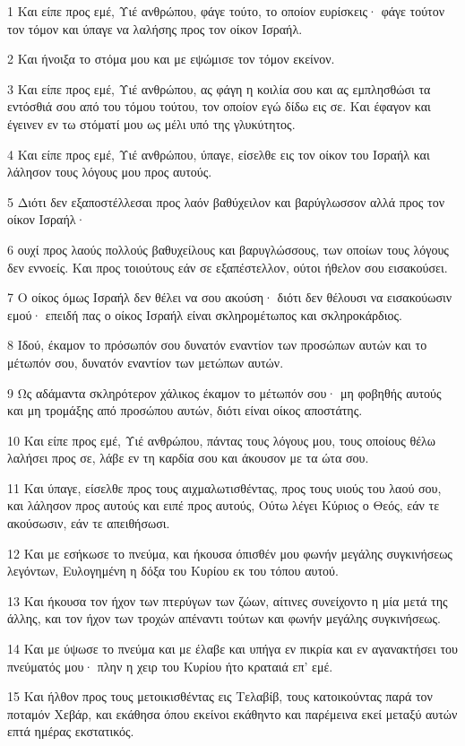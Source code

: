 \par 1 Και είπε προς εμέ, Υιέ ανθρώπου, φάγε τούτο, το οποίον ευρίσκεις· φάγε τούτον τον τόμον και ύπαγε να λαλήσης προς τον οίκον Ισραήλ.
\par 2 Και ήνοιξα το στόμα μου και με εψώμισε τον τόμον εκείνον.
\par 3 Και είπε προς εμέ, Υιέ ανθρώπου, ας φάγη η κοιλία σου και ας εμπλησθώσι τα εντόσθιά σου από του τόμου τούτου, τον οποίον εγώ δίδω εις σε. Και έφαγον και έγεινεν εν τω στόματί μου ως μέλι υπό της γλυκύτητος.
\par 4 Και είπε προς εμέ, Υιέ ανθρώπου, ύπαγε, είσελθε εις τον οίκον του Ισραήλ και λάλησον τους λόγους μου προς αυτούς.
\par 5 Διότι δεν εξαποστέλλεσαι προς λαόν βαθύχειλον και βαρύγλωσσον αλλά προς τον οίκον Ισραήλ·
\par 6 ουχί προς λαούς πολλούς βαθυχείλους και βαρυγλώσσους, των οποίων τους λόγους δεν εννοείς. Και προς τοιούτους εάν σε εξαπέστελλον, ούτοι ήθελον σου εισακούσει.
\par 7 Ο οίκος όμως Ισραήλ δεν θέλει να σου ακούση· διότι δεν θέλουσι να εισακούωσιν εμού· επειδή πας ο οίκος Ισραήλ είναι σκληρομέτωπος και σκληροκάρδιος.
\par 8 Ιδού, έκαμον το πρόσωπόν σου δυνατόν εναντίον των προσώπων αυτών και το μέτωπόν σου, δυνατόν εναντίον των μετώπων αυτών.
\par 9 Ως αδάμαντα σκληρότερον χάλικος έκαμον το μέτωπόν σου· μη φοβηθής αυτούς και μη τρομάξης από προσώπου αυτών, διότι είναι οίκος αποστάτης.
\par 10 Και είπε προς εμέ, Υιέ ανθρώπου, πάντας τους λόγους μου, τους οποίους θέλω λαλήσει προς σε, λάβε εν τη καρδία σου και άκουσον με τα ώτα σου.
\par 11 Και ύπαγε, είσελθε προς τους αιχμαλωτισθέντας, προς τους υιούς του λαού σου, και λάλησον προς αυτούς και ειπέ προς αυτούς, Ούτω λέγει Κύριος ο Θεός, εάν τε ακούσωσιν, εάν τε απειθήσωσι.
\par 12 Και με εσήκωσε το πνεύμα, και ήκουσα όπισθέν μου φωνήν μεγάλης συγκινήσεως λεγόντων, Ευλογημένη η δόξα του Κυρίου εκ του τόπου αυτού.
\par 13 Και ήκουσα τον ήχον των πτερύγων των ζώων, αίτινες συνείχοντο η μία μετά της άλλης, και τον ήχον των τροχών απέναντι τούτων και φωνήν μεγάλης συγκινήσεως.
\par 14 Και με ύψωσε το πνεύμα και με έλαβε και υπήγα εν πικρία και εν αγανακτήσει του πνεύματός μου· πλην η χειρ του Κυρίου ήτο κραταιά επ' εμέ.
\par 15 Και ήλθον προς τους μετοικισθέντας εις Τελαβίβ, τους κατοικούντας παρά τον ποταμόν Χεβάρ, και εκάθησα όπου εκείνοι εκάθηντο και παρέμεινα εκεί μεταξύ αυτών επτά ημέρας εκστατικός.
